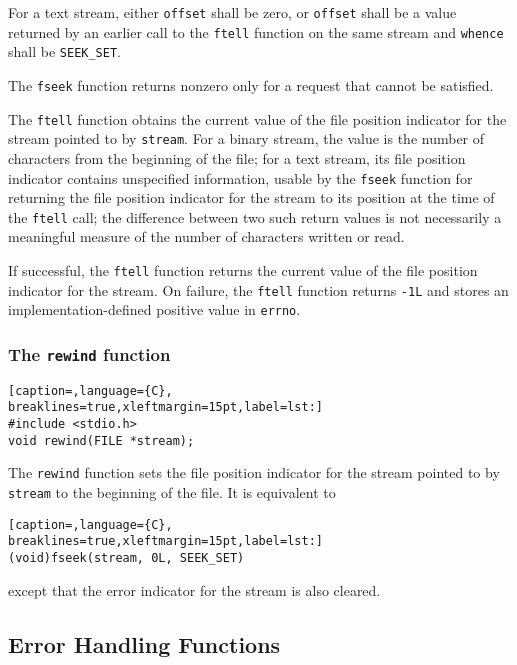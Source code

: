 For a text stream, either \texttt{offset} shall be zero, or \texttt{offset}
shall be a value returned by an earlier call to the \texttt{ftell} function on
the same stream and \texttt{whence} shall be \texttt{SEEK\_SET}.

The \texttt{fseek} function returns nonzero only for a request that cannot be
satisfied.

The \texttt{ftell} function obtains the current value of the file position
indicator for the stream pointed to by \texttt{stream}. For a binary stream,
the value is the number of characters from the beginning of the file; for a
text stream, its file position indicator contains unspecified information,
usable by the \texttt{fseek} function for returning the file position indicator
for the stream to its position at the time of the \texttt{ftell} call; the
difference between two such return values is not necessarily a meaningful
measure of the number of characters written or read.

If successful, the \texttt{ftell} function returns the current value of the
file position indicator for the stream. On failure, the \texttt{ftell} function
returns \texttt{-1L} and stores an implementation-defined positive value in
\texttt{errno}.

\subsubsection{The \texttt{rewind} function}
\lstset{basicstyle=\scriptsize, numbers=left, captionpos=b, tabsize=4}
\begin{lstlisting}[caption=,language={C},
breaklines=true,xleftmargin=15pt,label=lst:]
#include <stdio.h>
void rewind(FILE *stream);
\end{lstlisting}

The \texttt{rewind} function sets the file position indicator for the stream
pointed to by \texttt{stream} to the beginning of the file. It is equivalent to
\lstset{basicstyle=\scriptsize, numbers=left, captionpos=b, tabsize=4}
\begin{lstlisting}[caption=,language={C},
breaklines=true,xleftmargin=15pt,label=lst:]
(void)fseek(stream, 0L, SEEK_SET)
\end{lstlisting}

except that the error indicator for the stream is also cleared. 

\subsection{Error Handling Functions}

